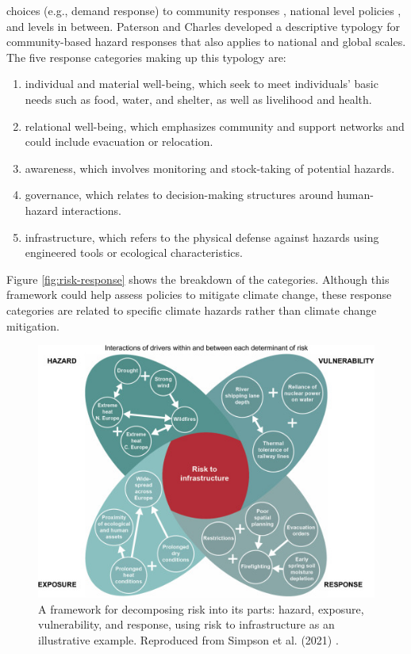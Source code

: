 choices (e.g., demand response) \cite{seck_embedding_2020,rinaldi_what_2022,
dehghanpour_agent-based_2018} to community responses
\cite{paterson_community-based_2019, elmallah_frontlining_2022}, national level
policies \cite{roelfsema_taking_2020, fawzy_strategies_2020}, and levels in
between. Paterson and Charles \cite{paterson_community-based_2019} developed a
descriptive typology for community-based hazard responses that also applies to
national and global scales. The five response categories making up this typology
are:
\cite{paterson_community-based_2019}
\begin{enumerate}
    \item individual and material well-being, which seek to meet individuals'
    basic needs such as food, water, and shelter, as well as livelihood and
    health.
    \item relational well-being, which emphasizes community and support networks
    and could include evacuation or relocation.
    \item awareness, which involves monitoring and stock-taking of potential
    hazards.
    \item governance, which relates to decision-making structures around
    human-hazard interactions.
    \item infrastructure, which refers to the physical defense against hazards
    using engineered tools or ecological characteristics.
\end{enumerate} 
Figure \ref{fig:risk-response} shows the breakdown of the categories. Although
this framework could help assess policies to mitigate climate change, these
response categories are related to specific climate hazards rather than climate
change mitigation.


\begin{figure}
    \centering
    \includegraphics{figures/02_literature_review/simpson-risk-framework.jpg}
    \caption{A framework for decomposing risk into its parts: hazard, exposure,
    vulnerability, and response, using risk to infrastructure as an illustrative
    example. Reproduced from Simpson et al. (2021)
    \cite{simpson_framework_2021}.}
    \label{fig:risk-framework}
\end{figure}

